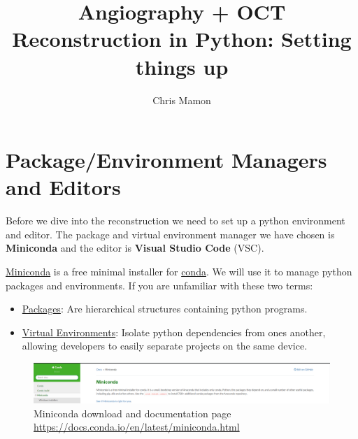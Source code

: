 \documentclass[10pt,a4paper]{article}
\author{Chris Mamon}
\title{Angiography + OCT Reconstruction in Python: Setting things up}
\date{}
\begin{document}
	\maketitle
	\section{Package/Environment Managers and Editors}
		Before we dive into the reconstruction we need to set up a python environment and editor. The package and virtual environment manager we have chosen is \textbf{Miniconda} and the editor is \textbf{Visual Studio Code} (VSC).

		\href{https://docs.conda.io/en/latest/miniconda.html}{Miniconda} is a free minimal installer for \href{https://www.anaconda.com/distribution/}{conda}. We will use it to manage python packages and environments. If you are unfamiliar with these two terms:
		\begin{itemize}
			\item \href{https://realpython.com/python-modules-packages/#reloading-a-module}{Packages}: Are hierarchical structures 	containing python programs.
			\item \href{https://www.geeksforgeeks.org/python-virtual-environment/}{Virtual Environments}: Isolate python dependencies from ones another, allowing developers to easily separate projects on the same device.
		\end{itemize}
		\begin{figure}[h]
			\centering
			\includegraphics[scale=0.25]{figures/miniconda.PNG}
			\caption{Miniconda download and documentation page \url{https://docs.conda.io/en/latest/miniconda.html}}
		\end{figure}
\end{document}
